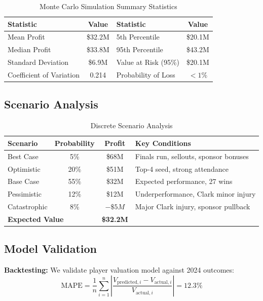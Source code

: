 \documentclass{mcmthesis}
\begin{document}
\begin{table}[H]
\centering
\caption{Monte Carlo Simulation Summary Statistics}
\begin{tabular}{lclc}
\toprule
\textbf{Statistic} & \textbf{Value} & \textbf{Statistic} & \textbf{Value} \\
\midrule
Mean Profit & \$32.2M & 5th Percentile & \$20.1M \\
Median Profit & \$33.8M & 95th Percentile & \$43.2M \\
Standard Deviation & \$6.9M & Value at Risk (95\%) & \$20.1M \\
Coefficient of Variation & 0.214 & Probability of Loss & $<1\%$ \\
\bottomrule
\end{tabular}
\end{table}

\subsection{Scenario Analysis}

\begin{table}[H]
\centering
\caption{Discrete Scenario Analysis}
\begin{tabular}{lccl}
\toprule
\textbf{Scenario} & \textbf{Probability} & \textbf{Profit} & \textbf{Key Conditions} \\
\midrule
Best Case & 5\% & \$68M & Finals run, sellouts, sponsor bonuses \\
Optimistic & 20\% & \$51M & Top-4 seed, strong attendance \\
Base Case & 55\% & \$32M & Expected performance, 27 wins \\
Pessimistic & 12\% & \$12M & Underperformance, Clark minor injury \\
Catastrophic & 8\% & $-\$5M$ & Major Clark injury, sponsor pullback \\
\midrule
\multicolumn{2}{l}{\textbf{Expected Value}} & \textbf{\$32.2M} & \\
\bottomrule
\end{tabular}
\end{table}

\subsection{Model Validation}

\textbf{Backtesting:} We validate player valuation model against 2024 outcomes:
\begin{equation}
\text{MAPE} = \frac{1}{n}\sum_{i=1}^{n}\left|\frac{V_{\text{predicted},i} - V_{\text{actual},i}}{V_{\text{actual},i}}\right| = 12.3\%
\end{equation}
\end{document}
